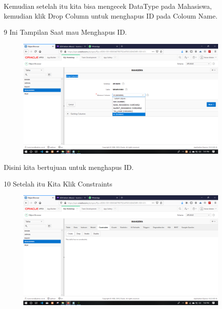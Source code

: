\begin{enumerate}
\par
Kemudian setelah itu kita bisa mengecek DataType pada Mahasiswa, kemudian klik Drop Column untuk menghapus ID pada Coloum Name.

\newpage
\item[9]Ini Tampilan Saat mau Menghapus ID.

\begin{figure}[!htbp]
    \begin{center}
    \includegraphics[scale=0.2]{figures/09.png}
    \end{center}   
    \end{figure}
    
\par
Disini kita bertujuan untuk menghapus ID.

\item[10]Setelah itu Kita Klik Constraints

\begin{figure}[!htbp]
    \begin{center}
    \includegraphics[scale=0.2]{figures/11.png}
    \end{center}   
    \end{figure}
    

\end{enumerate}
